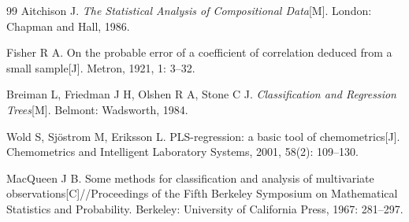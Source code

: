 \begin{thebibliography}{99}
  Aitchison J. \textit{The Statistical Analysis of Compositional Data}[M]. London: Chapman and Hall, 1986.

  Fisher R A. On the probable error of a coefficient of correlation deduced from a small sample[J]. Metron, 1921, 1: 3--32.

  Breiman L, Friedman J H, Olshen R A, Stone C J. \textit{Classification and Regression Trees}[M]. Belmont: Wadsworth, 1984.

  Wold S, Sj\"ostrom M, Eriksson L. PLS-regression: a basic tool of chemometrics[J]. Chemometrics and Intelligent Laboratory Systems, 2001, 58(2): 109--130.

  MacQueen J B. Some methods for classification and analysis of multivariate observations[C]//Proceedings of the Fifth Berkeley Symposium on Mathematical Statistics and Probability. Berkeley: University of California Press, 1967: 281--297.

\end{thebibliography}
